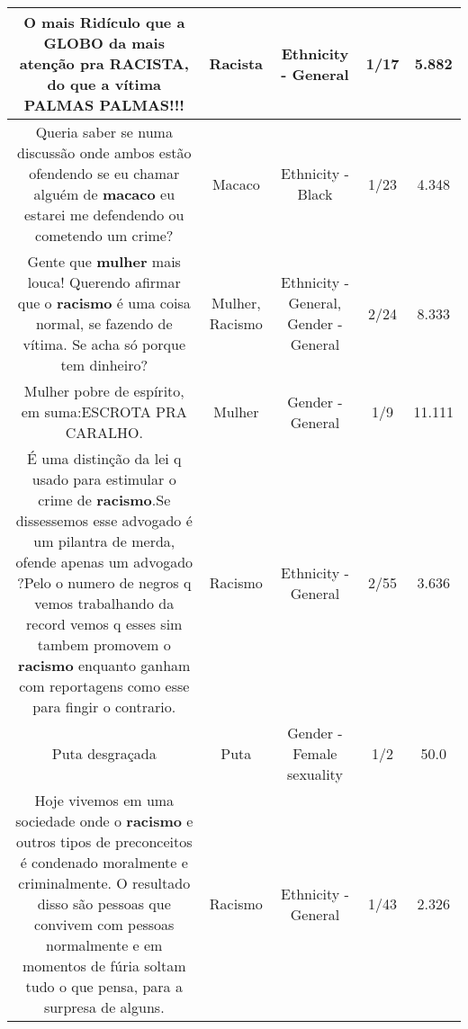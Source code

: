 \documentclass[11pt]{article}
\newlength\mylength
\begin{document}
\begin{center}
\begin{longtable}{|C{.65\mylength}|C{.30\mylength}|C{.12\mylength}|C{.12\mylength}|C{.12\mylength}|}
  \small O mais Ridículo que a GLOBO da mais atenção pra \textbf{RACISTA}, do que a vítima PALMAS PALMAS!!!\normalsize   & Racista & Ethnicity - General & 1/17 & 5.882 \\  \hline
  \small Queria saber se numa discussão onde ambos estão ofendendo se eu chamar alguém de \textbf{macaco} eu estarei me defendendo ou cometendo um crime?\normalsize   & Macaco & Ethnicity - Black & 1/23 & 4.348 \\  \hline
  \small Gente que \textbf{mulher} mais louca! Querendo afirmar que o \textbf{racismo} é uma coisa normal, se fazendo de vítima. Se acha só porque tem dinheiro?\normalsize   & Mulher, Racismo & Ethnicity - General, Gender - General & 2/24 & 8.333 \\  \hline
  \small Mulher pobre de espírito, em suma:ESCROTA PRA CARALHO.\normalsize   & Mulher & Gender - General & 1/9 & 11.111 \\  \hline
  \small É uma distinção da lei q usado para estimular o crime de \textbf{racismo}.Se dissessemos esse advogado é um pilantra de merda, ofende apenas um advogado ?Pelo o numero de negros q vemos trabalhando da record vemos q esses sim tambem promovem o \textbf{racismo} enquanto ganham com reportagens como esse para fingir o contrario.\normalsize   & Racismo & Ethnicity - General & 2/55 & 3.636 \\  \hline
  \small Puta desgraçada\normalsize   & Puta & Gender - Female sexuality & 1/2 & 50.0 \\  \hline
  \small Hoje vivemos em uma sociedade onde o \textbf{racismo} e outros tipos de preconceitos é condenado moralmente e criminalmente. O resultado disso são pessoas que convivem com pessoas normalmente e em momentos de fúria soltam tudo o que pensa, para a surpresa de alguns.\normalsize   & Racismo & Ethnicity - General & 1/43 & 2.326 \\  \hline

\end{longtable}
\end{center}
\end{document}
